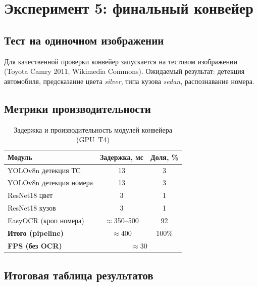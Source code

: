 \documentclass[14pt,a4paper]{report}
\numberwithin{equation}{chapter}
\numberwithin{figure}{chapter}
\numberwithin{table}{chapter}
\begin{document}
\section{Эксперимент 5: финальный конвейер}

\subsection{Тест на одиночном изображении}

Для качественной проверки конвейер запускается на тестовом изображении
(Toyota Camry 2011, Wikimedia Commons). Ожидаемый результат: детекция
автомобиля, предсказание цвета \textit{silver}, типа кузова \textit{sedan},
распознавание номера.


\subsection{Метрики производительности}

\begin{table}[H]
\centering
\caption{Задержка и производительность модулей конвейера (GPU~T4)}
\label{tab:pipeline_fps}
\begin{tabular}{lcc}
\toprule
\textbf{Модуль} & \textbf{Задержка, мс} & \textbf{Доля, \%} \\
\midrule
YOLOv8n детекция ТС       & 13 & 3 \\
YOLOv8n детекция номера   & 13 & 3 \\
ResNet18 цвет             & 3  & 1 \\
ResNet18 кузов            & 3  & 1 \\
EasyOCR (кроп номера)     & $\approx$350--500 & 92 \\
\midrule
\textbf{Итого (pipeline)} & $\approx$400 & 100\% \\
\textbf{FPS (без OCR)}    & \multicolumn{2}{c}{$\approx$30} \\
\bottomrule
\end{tabular}
\end{table}

\subsection{Итоговая таблица результатов}
\end{document}
